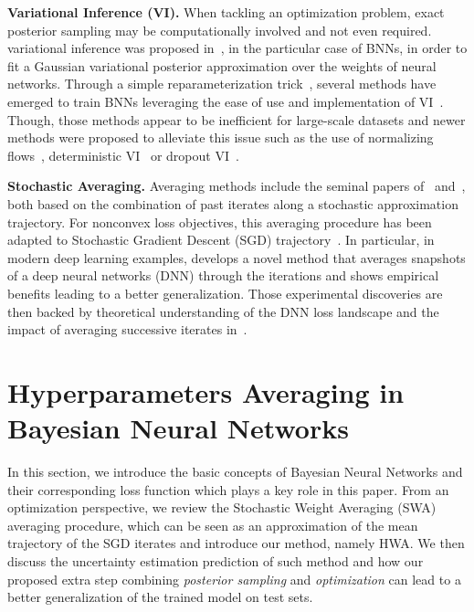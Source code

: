 \documentclass{article} %
\begin{document}
\textbf{Variational Inference (VI).}
When tackling an optimization problem, exact posterior sampling may be computationally involved and not even required.
variational inference was proposed in~\citep{graves2011practical}, in the particular case of BNNs, in order to fit a Gaussian variational posterior approximation over the weights of neural networks.
Through a simple reparameterization trick~\citep{blundell2015weight}, several methods have emerged to train BNNs leveraging the ease of use and implementation of VI~\citep{kingma2015variational,blundell2015weight,molchanov2017variational}.
Though, those methods appear to be inefficient for large-scale datasets and newer methods were proposed to alleviate this issue such as the use of normalizing flows~\citep{louizos2017multiplicative}, deterministic VI~\citep{wu2018deterministic} or dropout VI~\citep{gal2016dropout}.

\textbf{Stochastic Averaging.}
Averaging methods include the seminal papers of~\citep{polyak1990sa} and~\citep{ruppert1988efficient}, both based on the combination of past iterates along a stochastic approximation trajectory.
For nonconvex loss objectives, this averaging procedure has been adapted to Stochastic Gradient Descent (SGD) trajectory~\citep{zhou2017convergence}.
In particular, in modern deep learning examples, \citet{izmailov2018averaging} develops a novel method that averages snapshots of a deep neural networks (DNN) through the iterations and shows empirical benefits leading to a better generalization.
Those experimental discoveries are then backed by theoretical understanding of the DNN loss landscape and the impact of averaging successive iterates in~\citep{keskar2016large,he2019asymmetric}.


\section{Hyperparameters Averaging in Bayesian Neural Networks}\label{sec:main}

In this section, we introduce the basic concepts of Bayesian Neural Networks and their corresponding loss function which plays a key role in this paper.
From an optimization perspective, we review the Stochastic Weight Averaging (SWA)~\citep{izmailov2018averaging} averaging procedure, which can be seen as an approximation of the mean trajectory of the SGD iterates and introduce our method, namely HWA.
We then discuss the uncertainty estimation prediction of such method and how our proposed extra step combining \emph{posterior sampling} and \emph{optimization} can lead to a better generalization of the trained model on test sets.
\end{document}
